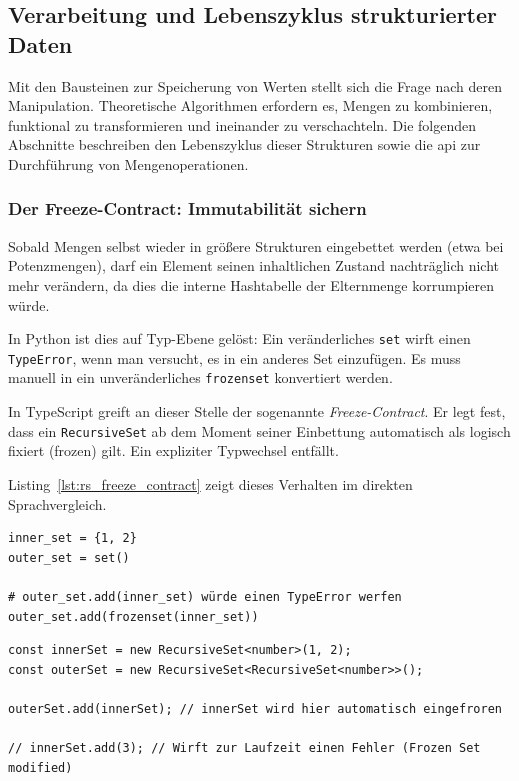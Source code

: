 \subsection{Verarbeitung und Lebenszyklus strukturierter Daten}
\label{subsec:rs-api-verarbeitung}

Mit den Bausteinen zur Speicherung von Werten stellt sich die Frage nach deren Manipulation. Theoretische Algorithmen erfordern es, Mengen zu kombinieren, funktional zu transformieren und ineinander zu verschachteln. Die folgenden Abschnitte beschreiben den Lebenszyklus dieser Strukturen sowie die \gls{api} zur Durchführung von Mengenoperationen.

\subsubsection{Der Freeze-Contract: Immutabilität sichern}
\label{subsubsec:rs-api-freeze}

Sobald Mengen selbst wieder in größere Strukturen eingebettet werden (etwa bei Potenzmengen), darf ein Element seinen inhaltlichen Zustand nachträglich nicht mehr verändern, da dies die interne Hashtabelle der Elternmenge korrumpieren würde.

In Python ist dies auf Typ-Ebene gelöst: Ein veränderliches \texttt{set} wirft einen \texttt{TypeError}, wenn man versucht, es in ein anderes Set einzufügen. Es muss manuell in ein unveränderliches \texttt{frozenset} konvertiert werden. 

In TypeScript greift an dieser Stelle der sogenannte \emph{Freeze-Contract}. Er legt fest, dass ein \texttt{RecursiveSet} ab dem Moment seiner Einbettung automatisch als logisch fixiert (frozen) gilt. Ein expliziter Typwechsel entfällt.

Listing~\ref{lst:rs_freeze_contract} zeigt dieses Verhalten im direkten Sprachvergleich.

\begin{listing}[ht]
    \caption{Der Freeze-Contract bei geschachtelten Mengen}
    \label{lst:rs_freeze_contract}
    \begin{verbatim}
inner_set = {1, 2}
outer_set = set()

# outer_set.add(inner_set) würde einen TypeError werfen
outer_set.add(frozenset(inner_set)) 
    \end{verbatim}
    
    
    
    \begin{verbatim}
const innerSet = new RecursiveSet<number>(1, 2);
const outerSet = new RecursiveSet<RecursiveSet<number>>();

outerSet.add(innerSet); // innerSet wird hier automatisch eingefroren

// innerSet.add(3); // Wirft zur Laufzeit einen Fehler (Frozen Set modified)
    \end{verbatim}
\end{listing}

